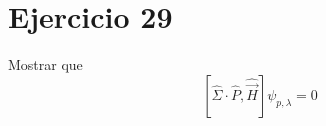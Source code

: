 \section*{Ejercicio 29}
Mostrar que 
\begin{equation*}
    \left[\hat{\Sigma}\cdot \hat{P}, \hat{\vec{H}}\right] \psi_{p,\lambda} = 0
\end{equation*}